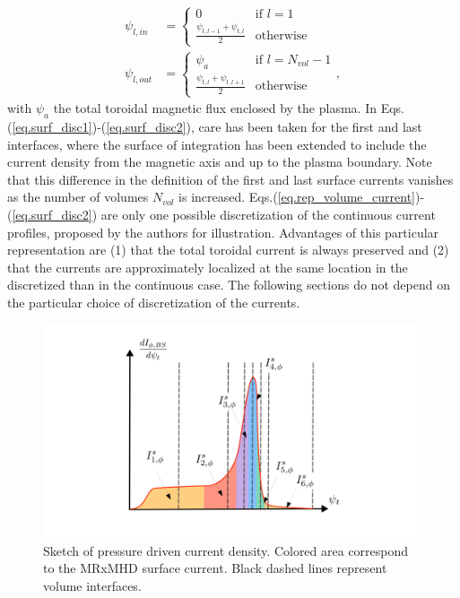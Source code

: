 \documentclass[my_thesis.tex]{subfiles}
\begin{document}
\begin{align}
    \psi_{l,in} &= \begin{cases}
    0 & \text{if } l=1\\
    \frac{\psi_{t,l-1} + \psi_{t,l}}{2} & \text{otherwise}
    \end{cases}\label{eq.surf_disc1} \\
    \psi_{l,out} &= \begin{cases}
    \psi_{a} & \text{if } l=N_{vol}-1\\
    \frac{\psi_{t,l} + \psi_{t,l+1}}{2} & \text{otherwise}
    \end{cases},\label{eq.surf_disc2}
\end{align}
with $\psi_{a}$ the total toroidal magnetic flux enclosed by the plasma. In Eqs.(\ref{eq.surf_disc1})-(\ref{eq.surf_disc2}), care has been taken for the first and last interfaces, where the surface of integration has been extended to include the current density from the magnetic axis and up to the plasma boundary. Note that this difference in the definition of the first and last surface currents vanishes as the number of volumes $N_{vol}$ is increased. Eqs.(\ref{eq.rep_volume_current})-(\ref{eq.surf_disc2}) are only one possible discretization of the continuous current profiles, proposed by the authors for illustration. Advantages of this particular representation are (1) that the total toroidal current is always preserved and (2) that the currents are approximately localized at the same location in the discretized than in the continuous case. The following sections do not depend on the particular choice of discretization of the currents.


\begin{figure}
    \centering
    \includegraphics[width=\linewidth]{main/Figures_CurrentConstraint/ABaillod_fig4.pdf}
    \caption{Sketch of pressure driven current density. Colored area correspond to the \ac{MRxMHD} surface current. Black dashed lines represent volume interfaces.}
    \label{fig:sketch_bootstrap}
\end{figure}
\end{document}
